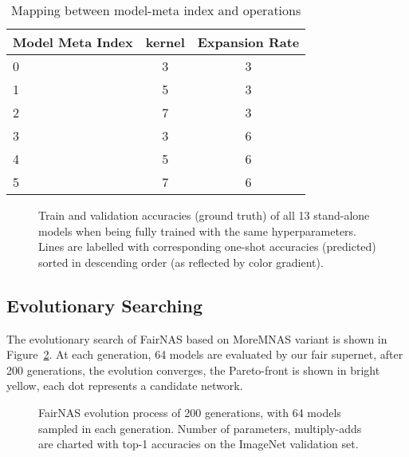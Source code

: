 \documentclass[10pt,twocolumn,letterpaper]{article}
\theoremstyle{definition}
\begin{document}
\begin{table}[ht]
	\begin{center}
		\begin{small}
				\begin{tabular}{lcc}
					\toprule
					Model Meta Index & kernel & Expansion Rate \\
					\midrule
					0 & 3&3 \\
					1 & 5&3 \\
					2 & 7&3 \\
					3 & 3&6 \\
					4 & 5&6 \\
					5 & 7&6 \\
					\bottomrule
				\end{tabular}
		\end{small}
	\end{center}
	\caption{Mapping between model-meta index and operations}
	\label{tab:meta-mapping}
\end{table}


\begin{figure}[ht]
\centering
{}
\vskip -0.2in
\caption{Train and validation accuracies (ground truth) of all 13 stand-alone models when being fully trained with the same hyperparameters. Lines are labelled with corresponding one-shot accuracies (predicted) sorted in descending order (as reflected by color gradient).}
\label{fig:standalone_val}
\end{figure}

\subsection{Evolutionary Searching}
The evolutionary search of FairNAS based on MoreMNAS variant \cite{chu2019multi} is shown in Figure~\ref{fig:fairnas-evolution}. At each generation, 64 models are evaluated by our fair supernet, after 200 generations, the evolution converges, the Pareto-front is shown in bright yellow, each dot represents a candidate network.
\begin{figure}[ht]
\centering
{}
\caption{FairNAS evolution process of 200 generations, with 64 models sampled in each generation. Number of parameters, multiply-adds are charted with top-1 accuracies on the ImageNet validation set. }
\label{fig:fairnas-evolution}
\end{figure}
\end{document}
